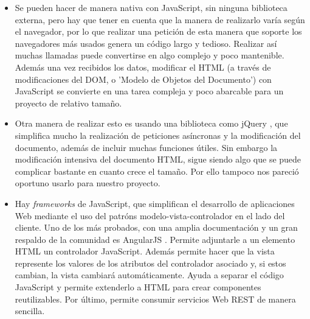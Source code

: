 \begin{itemize}
\item
Se pueden hacer de manera nativa con JavaScript, sin ninguna biblioteca externa, pero hay que tener en cuenta que la manera de realizarlo varía según el navegador,  por lo que realizar una petición de esta manera que soporte los navegadores más usados genera un código largo y tedioso. Realizar así muchas llamadas puede convertirse en algo complejo y poco mantenible. Además una vez recibidos los datos, modificar el HTML (a través de modificaciones del DOM, o 'Modelo de Objetos del Documento') con JavaScript se convierte en una tarea compleja y poco abarcable para un proyecto de relativo tamaño.

\item
Otra manera de realizar esto es usando una biblioteca como jQuery \cite{jQuery}, que simplifica mucho la realización de peticiones asíncronas y la modificación del documento, además de incluir muchas funciones útiles. Sin embargo la modificación intensiva del documento HTML, sigue siendo algo que se puede complicar bastante en cuanto crece el tamaño. Por ello tampoco nos pareció oportuno usarlo para nuestro proyecto.

\item
Hay \emph{frameworks} de JavaScript, que simplifican el desarrollo de aplicaciones Web mediante el uso del patróns modelo-vista-controlador en el lado del cliente. Uno de los más probados, con una amplia documentación y un gran respaldo de la comunidad es AngularJS \cite{angular}. Permite adjuntarle a un elemento HTML un controlador JavaScript. Además permite hacer que la vista represente los valores de los atributos del controlador asociado y, si estos cambian, la vista cambiará automáticamente. Ayuda a separar el código JavaScript y permite extenderlo a HTML para crear componentes reutilizables. Por último, permite consumir servicios Web REST de manera sencilla.
\end{itemize}


